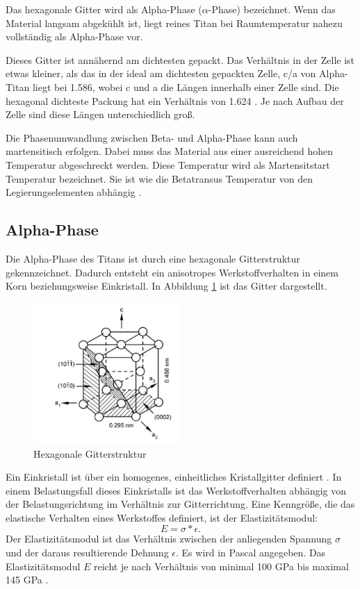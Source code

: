 \documentclass[a4paper, 11pt]{tubsreprt}
\begin{document}
Das hexagonale Gitter wird als Alpha-Phase ($\alpha$-Phase) bezeichnet. Wenn das Material langsam abgekühlt ist, liegt reines Titan bei Raumtemperatur nahezu vollständig als Alpha-Phase vor. 

Dieses Gitter ist annähernd am dichtesten gepackt. Das Verhältnis in der Zelle ist etwas kleiner, als das in der ideal am dichtesten gepackten Zelle, c/a von Alpha-Titan liegt bei 1.586, wobei c und a die Längen innerhalb einer Zelle sind. Die hexagonal dichteste Packung hat ein Verhältnis von 1.624 \cite{Luetjering2007}. Je nach Aufbau der Zelle sind diese Längen unterschiedlich groß.

Die Phasenumwandlung zwischen Beta- und Alpha-Phase kann auch martensitisch erfolgen. Dabei muss das Material aus einer ausreichend hohen Temperatur abgeschreckt werden. Diese Temperatur wird als Martensitstart Temperatur bezeichnet. Sie ist wie die Betatransus Temperatur von den Legierungselementen abhängig \cite{Luetjering2007}.

\newpage
\subsection{Alpha-Phase}
Die Alpha-Phase des Titans ist durch eine hexagonale Gitterstruktur gekennzeichnet. Dadurch entsteht ein anisotropes Werkstoffverhalten in einem Korn beziehungsweise Einkristall. In Abbildung \ref{Hexagonale Gitterstruktur} ist das Gitter dargestellt. 

\begin{figure}[h]
\centering
\includegraphics[width=0.5\textwidth]{Bilder/HexagonalesGitter.jpg}
\caption{Hexagonale Gitterstruktur \cite{Luetjering2007}}
\label{Hexagonale Gitterstruktur}
\end{figure}
Ein Einkristall ist über ein homogenes, einheitliches Kristallgitter definiert \cite{Luetjering2007}.
In einem Belastungsfall dieses Einkristalls ist das Werkstoffverhalten abhängig von der Belastungsrichtung im Verhältnis zur Gitterrichtung. Eine Kenngröße, die das elastische Verhalten eines Werkstoffes definiert, ist der Elastizitätsmodul: 
\begin{equation}
E=\sigma*\epsilon.
\end{equation}
Der Elastizitätsmodul ist das Verhältnis zwischen der anliegenden Spannung $\sigma$ und der daraus resultierende Dehnung $\epsilon$.
Es wird in Pascal angegeben. Das Elastizitätsmodul $E$ reicht je nach Verhältnis von minimal 100 GPa bis maximal 145 GPa \cite{Luetjering2007}.
\end{document}
